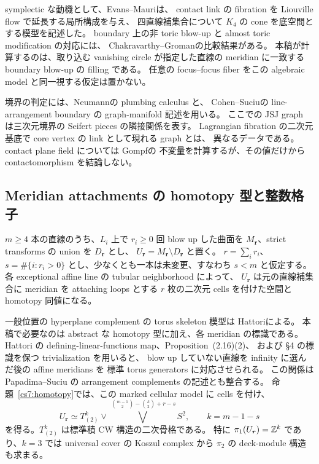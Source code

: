 symplectic な動機として、Evans--Mauri\cite[Lemmas~2.16, 2.22; \S3.1]{EM}は、
contact link の fibration を Liouville flow で延長する局所構成を与え、
四直線補集合について $K_4$ の cone を底空間とする模型を記述した。
boundary 上の非 toric blow-up と almost toric modification の対応には、
Chakravarthy--Groman\cite[Theorem~1.1, Lemma~3.7]{CGblowup}の比較結果がある。
本稿が計算するのは、取り込む vanishing circle が指定した直線の meridian に一致する
boundary blow-up の filling である。
任意の focus--focus fiber をこの algebraic model と同一視する仮定は置かない。

境界の判定には、Neumann\cite[\S5, pp.~321--322]{Neumann}の plumbing calculus と、
Cohen--Suciu\cite[\S2.5]{CohenSuciu}の line-arrangement boundary の graph-manifold 記述を用いる。
ここでの JSJ graph は三次元境界の Seifert pieces の隣接関係を表す。
Lagrangian fibration の二次元基底で core vertex の link として現れる graph とは、
異なるデータである。
contact plane field については Gompf\cite[Definition~4.2, Theorem~4.5]{Gompf}の
不変量を計算するが、その値だけから contactomorphism を結論しない。

\subsection{Meridian attachments の homotopy 型と整数格子}

$m\geq4$ 本の直線のうち、$L_i$ 上で $r_i\geq0$ 回 blow up した曲面を
$M_{\boldsymbol r}$、strict transforms の union を $D_{\boldsymbol r}$ とし、
$U_{\boldsymbol r}=M_{\boldsymbol r}\setminus D_{\boldsymbol r}$ と置く。
$r=\sum_i r_i$、$s=\#\{i:r_i>0\}$ とし、少なくとも一本は未変更、すなわち $s<m$ と仮定する。
各 exceptional affine line の tubular neighborhood によって、
$U_{\boldsymbol r}$ は元の直線補集合に meridian を attaching loops とする
$r$ 枚の二次元 cells を付けた空間と homotopy 同値になる。

一般位置の hyperplane complement の torus skeleton 模型は Hattori\cite{Hattori}による。
本稿で必要なのは abstract な homotopy 型に加え、各 meridian の標識である。
Hattori の defining-linear-functions map、Proposition~(2.16)(2)、
および \S4 の標識を保つ trivialization を用いると、
blow up していない直線を infinity に選んだ後の affine meridians を
標準 torus generators に対応させられる。
この関係は Papadima--Suciu\cite[\S\S1.1, 4.3; proof of Theorem~4.8(4)]{PapadimaSuciu}
の arrangement complements の記述とも整合する。
命題~\ref{cs7:homotopy}では、この marked cellular model に cells を付け、
\[
 U_{\boldsymbol r}\simeq
 T^k_{(2)}\vee\bigvee^{\,\binom{m-1}{2}-\binom{k}{2}+r-s}S^2,
 \qquad k=m-1-s
\]
を得る。$T^k_{(2)}$ は標準積 CW 構造の二次骨格である。
特に $\pi_1(U_{\boldsymbol r})=\mathbb Z^k$ であり、$k=3$ では
universal cover の Koszul complex から $\pi_2$ の deck-module 構造も求まる。

